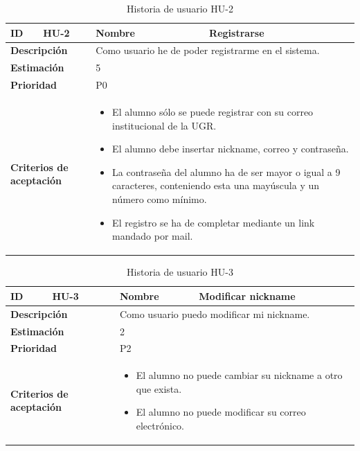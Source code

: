 \begin{table}[H]
    \centering
    \begin{tabular}{|p{2cm}|p{4cm}|p{2cm}|p{4cm}|}
        \hline
        \textbf{ID} & HU-2 & \textbf{Nombre} & Registrarse \\
        \hline
        \multicolumn{2}{|p{6cm}|}{\textbf{Descripción}} & \multicolumn{2}{p{6cm}|}{Como usuario he de poder registrarme en el sistema.} \\
        \hline
        \multicolumn{2}{|p{6cm}|}{\textbf{Estimación}} & \multicolumn{2}{p{6cm}|}{5} \\
        \hline
        \multicolumn{2}{|p{6cm}|}{\textbf{Prioridad}} & \multicolumn{2}{p{6cm}|}{P0} \\
        \hline
        \multicolumn{2}{|p{6cm}|}{\textbf{Criterios de aceptación}} & \multicolumn{2}{p{6cm}|}{
            \begin{itemize}
                \item El alumno sólo se puede registrar con su correo institucional de la UGR.
                \item El alumno debe insertar nickname, correo y contraseña.
                \item La contraseña del alumno ha de ser mayor o igual a 9 caracteres, conteniendo esta una mayúscula y un número como mínimo.
                \item El registro se ha de completar mediante un link mandado por mail.
            \end{itemize}
        } \\
        \hline
    \end{tabular}
    \caption{Historia de usuario HU-2}
    \label{tab:hu_2}
\end{table}

\begin{table}[H]
    \centering
    \begin{tabular}{|p{2cm}|p{4cm}|p{2cm}|p{4cm}|}
        \hline
        \textbf{ID} & HU-3 & \textbf{Nombre} & Modificar nickname \\
        \hline
        \multicolumn{2}{|p{6cm}|}{\textbf{Descripción}} & \multicolumn{2}{p{6cm}|}{Como usuario puedo modificar mi nickname.} \\
        \hline
        \multicolumn{2}{|p{6cm}|}{\textbf{Estimación}} & \multicolumn{2}{p{6cm}|}{2} \\
        \hline
        \multicolumn{2}{|p{6cm}|}{\textbf{Prioridad}} & \multicolumn{2}{p{6cm}|}{P2} \\
        \hline
        \multicolumn{2}{|p{6cm}|}{\textbf{Criterios de aceptación}} & \multicolumn{2}{p{6cm}|}{
            \begin{itemize}
                \item El alumno no puede cambiar su nickname a otro que exista.
                \item El alumno no puede modificar su correo electrónico.
            \end{itemize}
        } \\
        \hline
    \end{tabular}
    \caption{Historia de usuario HU-3}
    \label{tab:hu_3}
\end{table}

